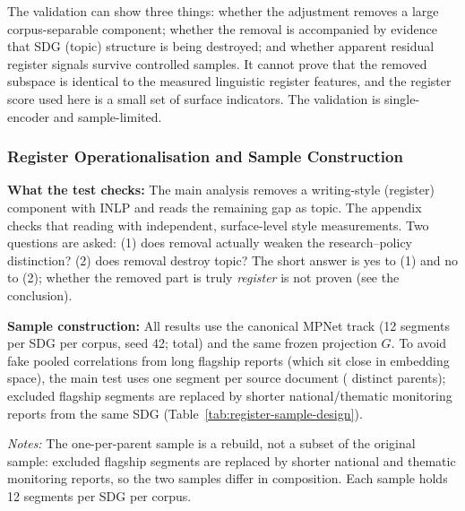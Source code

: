 \documentclass[12pt,a4paper]{article}
\begin{document}
The validation can show three things: whether the adjustment removes a large corpus-separable component; whether the removal is accompanied by evidence that SDG (topic) structure is being destroyed; and whether apparent residual register signals survive controlled samples. It cannot prove that the removed subspace is identical to the measured linguistic register features, and the register score used here is a small set of surface indicators. The validation is single-encoder and sample-limited.

\subsubsection{Register Operationalisation and Sample Construction}
\label{sec:regval-operationalisation}

\textbf{What the test checks:} The main analysis removes a writing-style (register) component with INLP and reads the remaining gap as topic. The appendix checks that reading with independent, surface-level style measurements. Two questions are asked: (1) does removal actually weaken the research--policy distinction? (2) does removal destroy topic? The short answer is yes to (1) and no to (2); whether the removed part is truly \emph{register} is not proven (see the conclusion).

  \textbf{Sample construction:} All results use the canonical MPNet track (12 segments per SDG per corpus, seed 42; \RegValSampleN{} total) and the same frozen projection $G$. To avoid fake pooled correlations from long flagship reports (which sit close in embedding space), the main test uses one segment per source document (\RegValOppDistinctParents{} distinct parents); excluded flagship segments are replaced by shorter national/thematic monitoring reports from the same SDG (Table~\ref{tab:register-sample-design}).

\begin{table}[ht]
\centering
\small
\caption{Validation sample construction: the two designs.}
\label{tab:register-sample-design}
\resizebox{\textwidth}{!}{}
\par\smallskip\footnotesize\emph{Notes:} The one-per-parent sample is a rebuild, not a subset of the original sample: excluded flagship segments are replaced by shorter national and thematic monitoring reports, so the two samples differ in composition. Each sample holds 12 segments per SDG per corpus.\par
\end{table}
\end{document}
